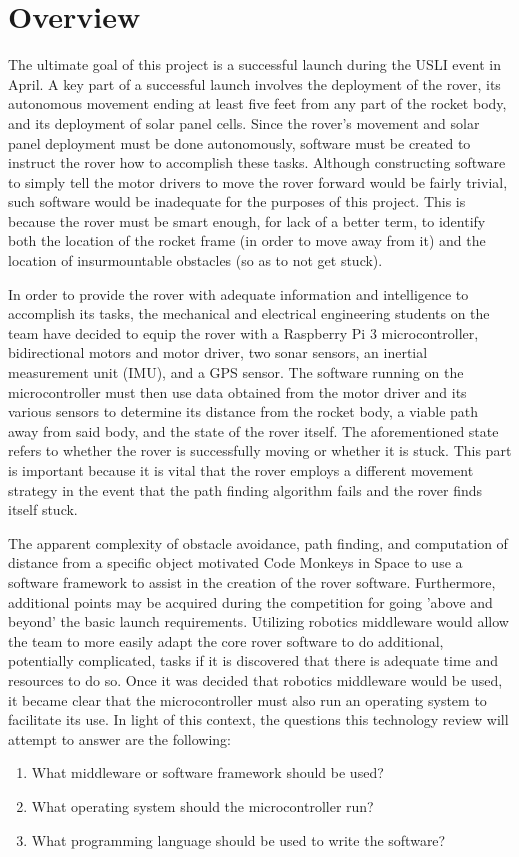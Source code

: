 \documentclass[onecolumn, draftclsnofoot,10pt, compsoc]{IEEEtran}
\begin{document}
\section{Overview}
The ultimate goal of this project is a successful launch during the USLI event in April. A key part of a successful launch involves the deployment of the rover, its autonomous movement ending at least five feet from any part of the rocket body, and its deployment of solar panel cells. Since the rover's movement and solar panel deployment must be done autonomously, software must be created to instruct the rover how to accomplish these tasks. Although constructing software to simply tell the motor drivers to move the rover forward would be fairly trivial, such software would be inadequate for the purposes of this project. This is because the rover must be smart enough, for lack of a better term, to identify both the location of the rocket frame (in order to move away from it) and the location of insurmountable obstacles (so as to not get stuck). 

In order to provide the rover with adequate information and intelligence to accomplish its tasks, the mechanical and electrical engineering students on the team have decided to equip the rover with a Raspberry Pi 3 microcontroller, bidirectional motors and motor driver, two sonar sensors, an inertial measurement unit (IMU), and a GPS sensor. The software running on the microcontroller must then use data obtained from the motor driver and its various sensors to determine its distance from the rocket body, a viable path away from said body, and the state of the rover itself. The aforementioned state refers to whether the rover is successfully moving or whether it is stuck. This part is important because it is vital that the rover employs a different movement strategy in the event that the path finding algorithm fails and the rover finds itself stuck. 

The apparent complexity of obstacle avoidance, path finding, and computation of distance from a specific object motivated Code Monkeys in Space to use a software framework to assist in the creation of the rover software. Furthermore, additional points may be acquired during the competition for going 'above and beyond' the basic launch requirements. Utilizing robotics middleware would allow the team to more easily adapt the core rover software to do additional, potentially complicated, tasks if it is discovered that there is adequate time and resources to do so. Once it was decided that robotics middleware would be used, it became clear that the microcontroller must also run an operating system to facilitate its use. In light of this context, the questions this technology review will attempt to answer are the following:
\begin{enumerate}
\item What middleware or software framework should be used?
\item What operating system should the microcontroller run?
\item What programming language should be used to write the software?
\end{enumerate}
\end{document}
